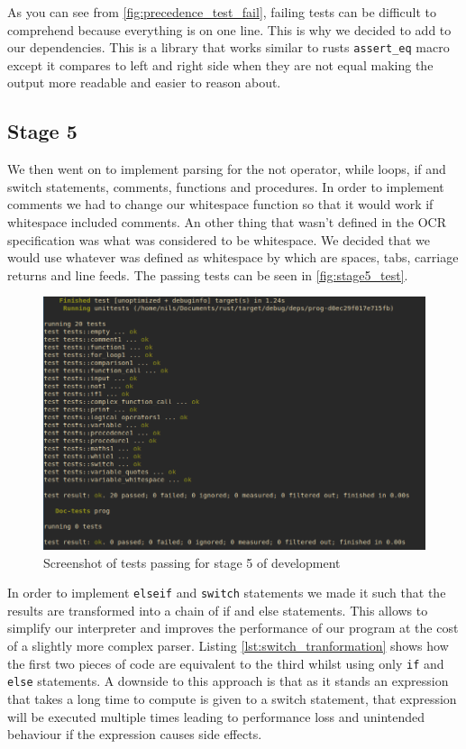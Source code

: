 \documentclass{article}
\begin{document}
As you can see from \autoref{fig:precedence_test_fail}, failing tests can be
difficult to comprehend because everything is on one line. This is why we
decided to add  to our dependencies. This is
a library that works similar to rusts \texttt{assert\_eq} macro except it
compares to left and right side when they are not equal making the output more
readable and easier to reason about.

\subsection{Stage 5}

We then went on to implement parsing for the not operator, while loops, if and
switch statements, comments, functions and procedures. In order to implement
comments we had to change our whitespace function so that it would work if
whitespace included comments. An other thing that wasn't defined in the OCR
specification was what was considered to be whitespace. We decided that we
would use whatever was defined as whitespace by  which are
spaces, tabs, carriage returns and line feeds. The passing tests can be seen
in \autoref{fig:stage5_test}.

\begin{figure}
	\includegraphics[width=\textwidth]{stage5_test}
	\caption{Screenshot of tests passing for stage 5 of development}
	\label{fig:stage5_test}
\end{figure}

In order to implement \texttt{elseif} and \texttt{switch} statements we made it
such that the results are transformed into a chain of if and else statements.
This allows to simplify our interpreter and improves the performance of our
program at the cost of a slightly more complex parser. Listing
\ref{lst:switch_tranformation} shows how the first two pieces of code are
equivalent to the third whilst using only \texttt{if} and \texttt{else}
statements. A downside to this approach is that as it stands an expression that
takes a long time to compute is given to a switch statement, that expression
will be executed multiple times leading to performance loss and unintended
behaviour if the expression causes side effects.
\end{document}
